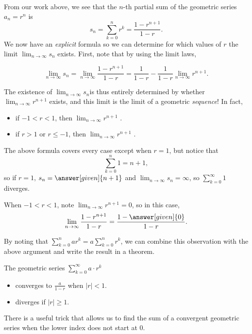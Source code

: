 \documentclass{ximera}
\begin{document}
From our work above, we see that the $n$-th partial sum of the
geometric series $a_n = r^n$ is
\[
s_n = \sum_{k=0}^{n} r^k= \frac{1 - r^{n+1}}{1-r}.
\]
We now have an \emph{explicit} formula so we can determine for which values of $r$ the limit $\lim_{n \to \infty} s_n$ exists.  First, note that by using the limit laws, 

\[
\lim_{n \to \infty} s_n = \lim_{n \to \infty}  \frac{1 - r^{n+1}}{1-r} =  \frac{1}{1-r}  - \frac{1}{1-r}  \lim_{n \to \infty} r^{n+1}.
\]

The existence of $\lim_{n \to \infty} s_n $is thus entirely determined by whether $\lim_{n \to \infty} r^{n+1}$ exists, and this limit is the limit of a geometric \emph{sequence}!  In fact, 

\begin{itemize}
\item if $-1<r<1$, then $\lim_{n \to \infty} r^{n+1}$ .
\item if $r>1$ or $r\le -1$, then $\lim_{n \to \infty} r^{n+1}$ .
\end{itemize}

The above formula covers every case except when $r= 1$, but notice that  $$\sum_{k=0}^n 1 = n+1,$$ so if $r=1$, $s_n = \answer[given]{n+1}$ and $\lim_{n \to \infty} s_n = \infty$, so $\sum_{k=0}^{\infty} 1$ diverges. 

When $-1<r<1$, note $\lim_{n \to \infty} r^{n+1}=0$, so in this case,     \[
    \lim_{n\to\infty}\frac{1 - r^{n+1}}{1-r} = \frac{1-\answer[given]{0}}{1-r}.
    \]

By noting that $\sum_{k=0}^n ar^k = a \sum_{k=0}^n r^k$, we can combine this observation with the above argument and write the result in a theorem.

\begin{theorem}
  The geometric series $\sum_{k= 0}^\infty a \cdot r^k$ 
  
  \begin{itemize} 
  \item converges to $\frac{a}{1-r}$ when $|r| < 1$.
  \item diverges if $|r| \geq 1$.  
  \end{itemize}
  \end{theorem}

There is a useful trick that allows us to find the sum of a convergent geometric series when the lower index does not start at $0$.  
\end{document}
